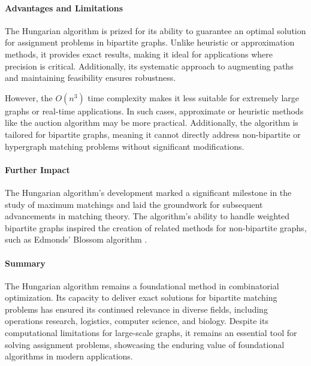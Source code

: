 \paragraph{Advantages and Limitations}
The Hungarian algorithm is prized for its ability to guarantee an optimal solution for assignment problems in bipartite graphs. Unlike heuristic or approximation methods, it provides exact results, making it ideal for applications where precision is critical. Additionally, its systematic approach to augmenting paths and maintaining feasibility ensures robustness.

However, the \(O(n^3)\) time complexity makes it less suitable for extremely large graphs or real-time applications. In such cases, approximate or heuristic methods like the auction algorithm may be more practical. Additionally, the algorithm is tailored for bipartite graphs, meaning it cannot directly address non-bipartite or hypergraph matching problems without significant modifications.

\paragraph{Further Impact}
The Hungarian algorithm's development marked a significant milestone in the study of maximum matchings and laid the groundwork for subsequent advancements in matching theory. The algorithm's ability to handle weighted bipartite graphs inspired the creation of related methods for non-bipartite graphs, such as Edmonds' Blossom algorithm \cite{edmonds1965paths}.

\paragraph{Summary}
The Hungarian algorithm remains a foundational method in combinatorial optimization. Its capacity to deliver exact solutions for bipartite matching problems has ensured its continued relevance in diverse fields, including operations research, logistics, computer science, and biology. Despite its computational limitations for large-scale graphs, it remains an essential tool for solving assignment problems, showcasing the enduring value of foundational algorithms in modern applications.
